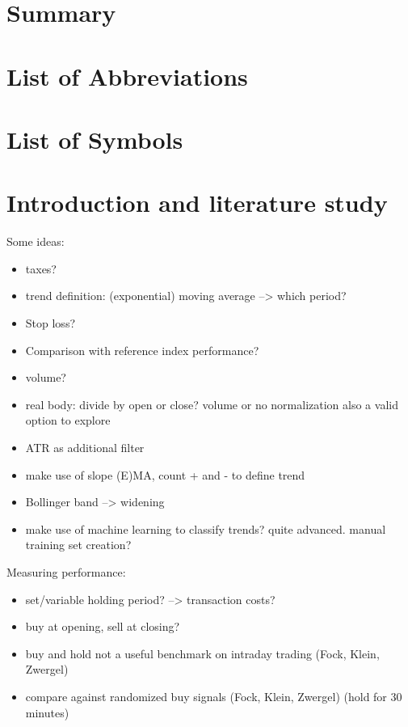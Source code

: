 \documentclass[
  12pt,
  a4paper,
  oneside]{book}
\begin{document}
\chapter{Summary}\label{summary}

\chapter{List of Abbreviations}\label{list-of-abbreviations}

\chapter{List of Symbols}\label{list-of-symbols}

\tableofcontents
\mainmatter

\chapter{Introduction and literature study}\label{introduction-and-literature-study}

Some ideas:

\begin{itemize}
\item
  taxes?
\item
  trend definition: (exponential) moving average --\textgreater{} which period?
\item
  Stop loss?
\item
  Comparison with reference index performance?
\item
  volume?
\item
  real body: divide by open or close? volume or no normalization also a valid option to explore
\item
  ATR as additional filter
\item
  make use of slope (E)MA, count + and - to define trend
\item
  Bollinger band --\textgreater{} widening
\item
  make use of machine learning to classify trends? quite advanced. manual training set creation?
\end{itemize}

Measuring performance:

\begin{itemize}
\item
  set/variable holding period? --\textgreater{} transaction costs?
\item
  buy at opening, sell at closing?
\item
  buy and hold not a useful benchmark on intraday trading (Fock, Klein, Zwergel)
\item
  compare against randomized buy signals (Fock, Klein, Zwergel) (hold for 30 minutes)
\end{itemize}
\end{document}
